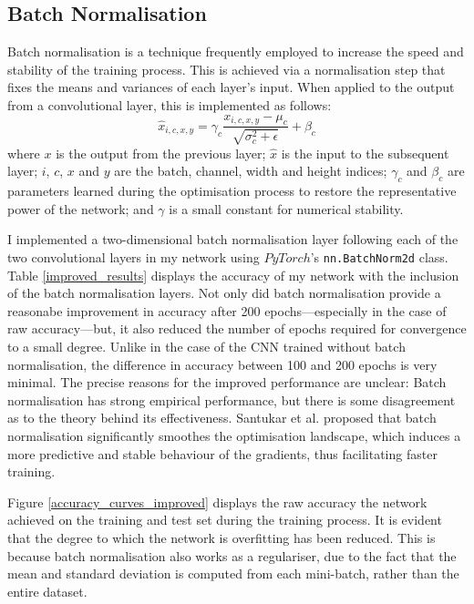 \documentclass[conference]{IEEEtran}
\begin{document}
\subsection{Batch Normalisation}

Batch normalisation \cite{IoffeSzegedy} is a technique frequently employed to increase the speed and stability of the training process.
This is achieved via a normalisation step that fixes the means and variances of each layer's input.
When applied to the output from a convolutional layer, this is implemented as follows:
\[
\hat{x}_{i,c,x,y}=\gamma_c\frac{x_{i,c,x,y}-\mu_c}{\sqrt{\sigma_c^2+\epsilon}}+\beta_c
\]
where $x$ is the output from the previous layer; $\hat{x}$ is the input to the subsequent layer; $i$, $c$, $x$ and $y$ are the batch, channel, width and height indices; $\gamma_c$ and $\beta_c$ are parameters learned during the optimisation process to restore the representative power of the network; and $\gamma$ is a small constant for numerical stability.

I implemented a two-dimensional batch normalisation layer following each of the two convolutional layers in my network using $PyTorch$'s \texttt{nn.BatchNorm2d} class.
Table \ref{improved_results} displays the accuracy of my network with the inclusion of the batch normalisation layers.
Not only did batch normalisation provide a reasonabe improvement in accuracy after 200 epochs---especially in the case of raw accuracy---but, it also reduced the number of epochs required for convergence to a small degree.
Unlike in the case of the CNN trained without batch normalisation, the difference in accuracy between 100 and 200 epochs is very minimal.
The precise reasons for the improved performance are unclear: Batch normalisation has strong empirical performance, but there is some disagreement as to the theory behind its effectiveness.
Santukar et al. \cite{SanturkarEtAl} proposed that batch normalisation significantly smoothes the optimisation landscape, which induces a more predictive and stable behaviour of the gradients, thus facilitating faster training.

Figure \ref{accuracy_curves_improved} displays the raw accuracy the network achieved on the training and test set during the training process.
It is evident that the degree to which the network is overfitting has been reduced.
This is because batch normalisation also works as a regulariser, due to the fact that the mean and standard deviation is computed from each mini-batch, rather than the entire dataset.
\end{document}

